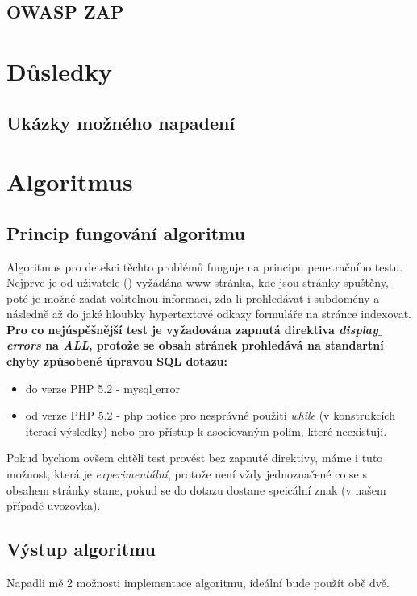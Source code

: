 \documentclass[12pt, a4paper]{report}
\begin{document}
\section{OWASP ZAP}


\chapter{Důsledky}

\section{Ukázky možného napadení}

\chapter{Algoritmus}
\section{Princip fungování algoritmu}
Algoritmus pro detekci těchto problémů funguje na principu penetračního testu. Nejprve je od uživatele () vyžádána www stránka, kde jsou stránky spuštěny, poté je možné zadat volitelnou informaci, zda-li prohledávat i subdomény a následně až do jaké hloubky hypertextové odkazy \/ formuláře na stránce indexovat. \textbf{Pro co nejúspěšnější test je vyžadována zapnutá direktiva \textit{display$\_$errors} na \textit{ALL}, protože se obsah stránek prohledává na standartní chyby způsobené úpravou SQL dotazu:}
\begin{itemize}
\item do verze PHP 5.2 - mysql$\_$error
\item od verze PHP 5.2 - php notice pro nesprávné použití \textit{while} (v konstrukcích iterací výsledky) nebo pro přístup k asociovaným polím, které neexistují.
\end{itemize}
Pokud bychom ovšem chtěli test provést bez zapnuté direktivy, máme i tuto možnost, která je \textit{experimentální}, protože není vždy jednoznačené co se s obsahem stránky stane, pokud se do dotazu dostane speicální znak (v našem případě uvozovka).

\section{Výstup algoritmu}

Napadli mě 2 možnosti implementace algoritmu, ideální bude použít obě dvě.
\end{document}
